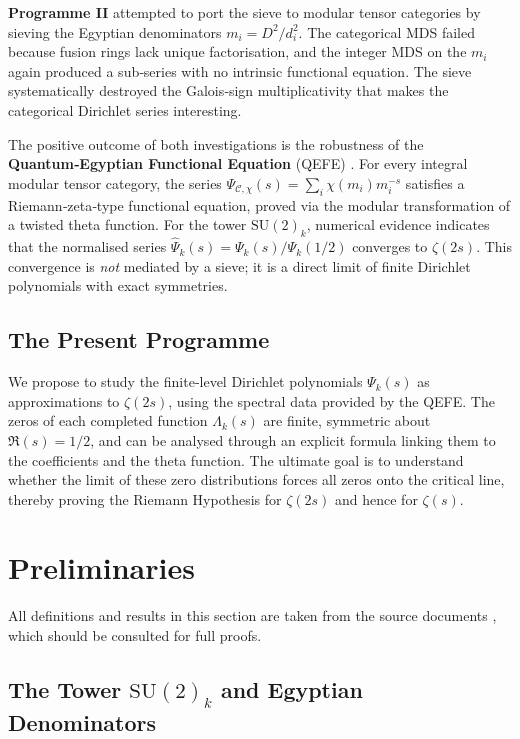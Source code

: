 \documentclass[11pt,a4paper]{article}
\theoremstyle{remark}
\begin{document}
\textbf{Programme II} attempted to port the sieve to modular tensor categories by sieving the Egyptian denominators \(m_i=D^2/d_i^2\).
The categorical MDS failed because fusion rings lack unique factorisation, and the integer MDS on the \(m_i\) again produced a sub‑series with no intrinsic functional equation.
The sieve systematically destroyed the Galois‑sign multiplicativity that makes the categorical Dirichlet series interesting.

The positive outcome of both investigations is the robustness of the \textbf{Quantum‑Egyptian Functional Equation} (QEFE) \cite{qefe}.
For every integral modular tensor category, the series \(\Psi_{\mathcal{C},\chi}(s)=\sum_i\chi(m_i)m_i^{-s}\) satisfies a Riemann‑zeta‑type functional equation, proved via the modular transformation of a twisted theta function.
For the tower \(\mathrm{SU}(2)_k\), numerical evidence indicates that the normalised series \(\widehat{\Psi}_k(s)=\Psi_k(s)/\Psi_k(1/2)\) converges to \(\zeta(2s)\).
This convergence is \emph{not} mediated by a sieve; it is a direct limit of finite Dirichlet polynomials with exact symmetries.

\subsection{The Present Programme}

We propose to study the finite‑level Dirichlet polynomials \(\Psi_k(s)\) as approximations to \(\zeta(2s)\), using the spectral data provided by the QEFE.
The zeros of each completed function \(\Lambda_k(s)\) are finite, symmetric about \(\Re(s)=1/2\), and can be analysed through an explicit formula linking them to the coefficients and the theta function.
The ultimate goal is to understand whether the limit of these zero distributions forces all zeros onto the critical line, thereby proving the Riemann Hypothesis for \(\zeta(2s)\) and hence for \(\zeta(s)\).

\section{Preliminaries}

All definitions and results in this section are taken from the source documents \cite{greedy-continuation,greedy-sieve,qefe}, which should be consulted for full proofs.

\subsection{The Tower \(\mathrm{SU}(2)_k\) and Egyptian Denominators}
\end{document}
